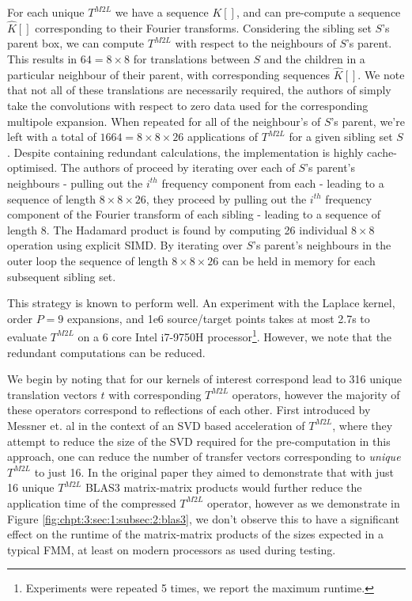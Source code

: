 For each unique $T^{M2L}$ we have a sequence $K[ ]$, and can pre-compute a sequence $\hat{K}[ ]$ corresponding to their Fourier transforms. Considering the sibling set $S$'s parent box, we can compute $T^{M2L}$ with respect to the neighbours of $S$'s parent. This results in $64 = 8 \times 8$ for translations between $S$ and the children in a particular neighbour of their parent, with corresponding sequences $\hat{K}[ ]$. We note that not all of these translations are necessarily required, the authors of \cite{malhotra2015pvfmm,wang2021exafmm} simply take the convolutions with respect to zero data used for the corresponding multipole expansion. When repeated for all of the neighbour's of $S$'s parent, we're left with a total of $1664 = 8 \times 8 \times 26$ applications of $T^{M2L}$ for a given sibling set $S$. Despite containing redundant calculations, the implementation is highly cache-optimised. The authors of \cite{malhotra2015pvfmm} proceed by iterating over each of $S$'s parent's neighbours - pulling out the $i^{th}$ frequency component from each - leading to a sequence of length $8 \times 8 \times 26$, they proceed by pulling out the $i^{th}$ frequency component of the Fourier transform of each sibling - leading to a sequence of length 8. The Hadamard product is found by computing 26 individual $8 \times 8$ operation using explicit SIMD. By iterating over $S$'s parent's neighbours in the outer loop the sequence of length $8 \times 8 \times 26$ can be held in memory for each subsequent sibling set.

This strategy is known to perform well. An experiment with the Laplace kernel, order $P=9$ expansions, and 1e6 source/target points takes at most 2.7s to evaluate $T^{M2L}$ on a 6 core Intel i7-9750H processor\footnote{Experiments were repeated 5 times, we report the maximum runtime.}. However, we note that the redundant computations can be reduced.

We begin by noting that for our kernels of interest correspond lead to 316 unique translation vectors $t$ with corresponding $T^{M2L}$ operators, however the majority of these operators correspond to reflections of each other. First introduced by Messner et. al \cite{messner2012optimized} in the context of an SVD based acceleration of $T^{M2L}$, where they attempt to reduce the size of the SVD required for the pre-computation in this approach, one can reduce the number of transfer vectors corresponding to \textit{unique} $T^{M2L}$ to just 16. In the original paper they aimed to demonstrate that with just 16 unique $T^{M2L}$ BLAS3 matrix-matrix products would further reduce the application time of the compressed $T^{M2L}$ operator, however as we demonstrate in Figure \ref{fig:chpt:3:sec:1:subsec:2:blas3}, we don't observe this to have a significant effect on the runtime of the matrix-matrix products of the sizes expected in a typical FMM, at least on modern processors as used during testing.

